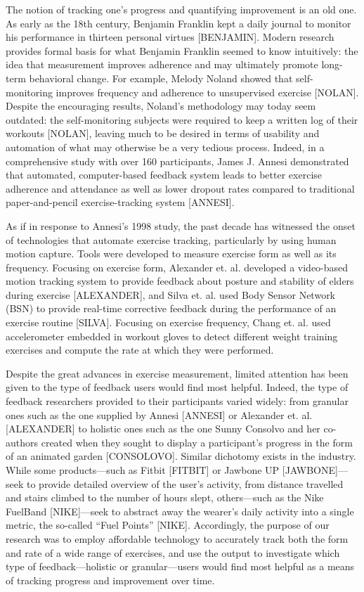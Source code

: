 The notion of tracking one’s progress and quantifying improvement is an old one. As early as the 18th century, Benjamin Franklin kept a daily journal to monitor his performance in thirteen personal virtues [BENJAMIN]. Modern research provides formal basis for what Benjamin Franklin seemed to know intuitively: the idea that measurement improves adherence and may ultimately promote long-term behavioral change. For example, Melody Noland showed that self-monitoring improves frequency and adherence to unsupervised exercise [NOLAN]. Despite the encouraging results, Noland’s methodology may today seem outdated: the self-monitoring subjects were required to keep a written log of their workouts [NOLAN], leaving much to be desired in terms of usability and automation of what may otherwise be a very tedious process. Indeed, in a comprehensive study with over 160 participants, James J. Annesi demonstrated that automated, computer-based feedback system leads to better exercise adherence and attendance as well as lower dropout rates compared to traditional paper-and-pencil exercise-tracking system [ANNESI].

As if in response to Annesi’s 1998 study, the past decade has witnessed the onset of technologies that automate exercise tracking, particularly by using human motion capture. Tools were developed to measure exercise form as well as its frequency. Focusing on exercise form, Alexander et. al. developed a video-based motion tracking system to provide feedback about posture and stability of elders during exercise [ALEXANDER], and Silva et. al. used Body Sensor Network (BSN) to provide real-time corrective feedback during the performance of an exercise routine [SILVA]. Focusing on exercise frequency, Chang et. al. used accelerometer embedded in workout gloves to detect different weight training exercises and compute the rate at which they were performed.

Despite the great advances in exercise measurement, limited attention has been given to the type of feedback users would find most helpful.  Indeed, the type of feedback researchers provided to their participants varied widely: from granular ones such as the one supplied by Annesi [ANNESI] or Alexander et. al. [ALEXANDER] to holistic ones such as the one Sunny Consolvo and her co-authors created when they sought to display a participant’s progress in the form of an animated garden [CONSOLOVO]. Similar dichotomy exists in the industry. While some products—such as Fitbit [FITBIT] or Jawbone UP [JAWBONE]—seek to provide detailed overview of the user’s activity, from distance travelled and stairs climbed to the number of hours slept, others—such as the Nike FuelBand [NIKE]—seek to abstract away the wearer’s daily activity into a single metric, the so-called “Fuel Points” [NIKE]. Accordingly, the purpose of our research was to employ affordable technology to accurately track both the form and rate of a wide range of exercises, and use the output to investigate which type of feedback—holistic or granular—users would find most helpful as a means of tracking progress and improvement over time.